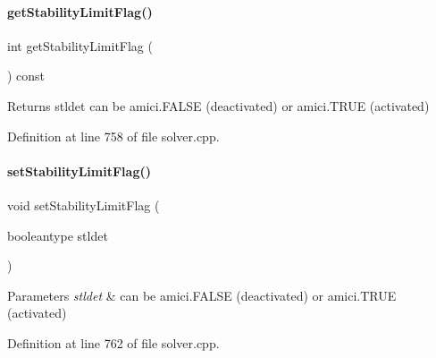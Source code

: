 \paragraph{\texorpdfstring{getStabilityLimitFlag()}{getStabilityLimitFlag()}}
{\footnotesize\ttfamily int get\+Stability\+Limit\+Flag (\begin{DoxyParamCaption}{ }\end{DoxyParamCaption}) const}

\begin{DoxyReturn}{Returns}
stldet can be amici.\+F\+A\+L\+SE (deactivated) or amici.\+T\+R\+UE (activated) 
\end{DoxyReturn}


Definition at line 758 of file solver.\+cpp.

\mbox{\label{classamici_1_1_solver_a618a94f1d84f9c71230d476f9a0205ce}} 
\paragraph{\texorpdfstring{setStabilityLimitFlag()}{setStabilityLimitFlag()}}
{\footnotesize\ttfamily void set\+Stability\+Limit\+Flag (\begin{DoxyParamCaption}\item[{booleantype}]{stldet }\end{DoxyParamCaption})}


\begin{DoxyParams}{Parameters}
{\em stldet} & can be amici.\+F\+A\+L\+SE (deactivated) or amici.\+T\+R\+UE (activated) \\
\hline
\end{DoxyParams}


Definition at line 762 of file solver.\+cpp.


